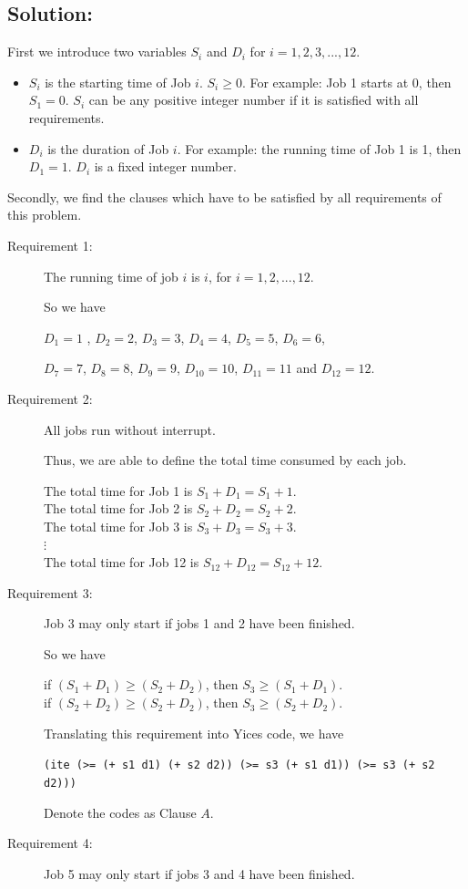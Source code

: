 \documentclass[11pt]{article}
\begin{document}
{{\vspace{4mm}

\subsection*{Solution:}
First we introduce two variables $S_{i}$ and $D_{i}$ for $i = 1,2,3,...,12$.
\begin{itemize}
  \item $S_{i}$ is the starting time of Job $i$. $S_{i} \geq 0$. For example: Job 1 starts at 0, then $S_{1} = 0$. $S_{i}$ can be any positive integer number if it is satisfied with all requirements.
  \item $D_{i}$ is the duration of Job $i$. For example: the running time of Job 1 is 1, then $D_{1} = 1$. $D_{i}$ is a fixed integer number.
\end{itemize}

Secondly, we find the clauses which have to be satisfied by  all requirements of this problem.

\begin{description}
  \item[Requirement 1:] The running time of job $i$ is $i$, for $i = 1, 2, . . . , 12$.

  So we have

  $D_{1}=1$ , $D_{2}=2$, $D_{3}=3$, $D_{4}=4$, $D_{5}=5$, $D_{6}=6$,

  $D_{7}=7$, $D_{8}=8$, $D_{9}=9$, $D_{10}=10$, $D_{11}=11$ and $D_{12}=12$.
  \item[Requirement 2:] All jobs run without interrupt.

  Thus, we are able to define the total time consumed by each job. \\
    \begin{center}
    The total time for Job 1 is $S_{1}+D_{1}=S_{1}+1$.\\
    The total time for Job 2 is $S_{2}+D_{2}=S_{2}+2$.\\
    The total time for Job 3 is $S_{3}+D_{3}=S_{3}+3$.\\
    $\vdots$\\
    The total time for Job 12 is $S_{12}+D_{12}=S_{12}+12$.
    \end{center}
  \item[Requirement 3:] Job 3 may only start if jobs 1 and 2 have been finished.

  So we have
  \begin{center}
  if $(S_{1}+D_{1}) \geq (S_{2}+D_{2})$, then $S_{3} \geq (S_{1}+D_{1})$.\\
  if $(S_{2}+D_{2}) \geq (S_{2}+D_{2})$, then $S_{3} \geq (S_{2}+D_{2})$.
  \end{center}
  Translating this requirement into Yices code, we have
  \begin{center}
  {\tt (ite (>= (+ s1 d1) (+ s2 d2)) (>= s3 (+ s1 d1)) (>= s3 (+ s2 d2)))}
  \end{center}
  Denote the codes as Clause $A$.
  \item[Requirement 4:] Job 5 may only start if jobs 3 and 4 have been finished.


\end{description}}}
\end{document}
